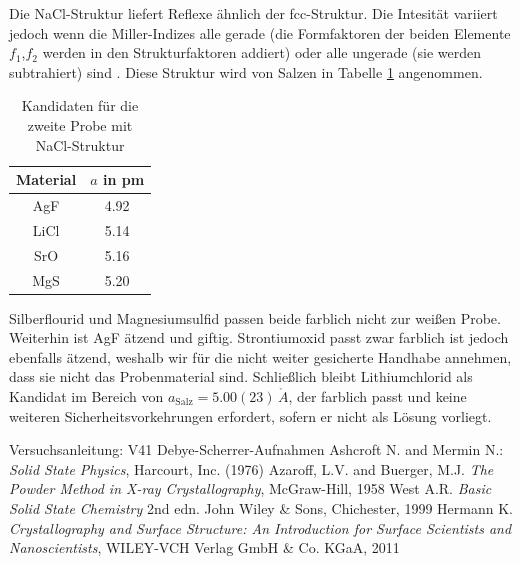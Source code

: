 \noindent
Die NaCl-Struktur liefert Reflexe ähnlich der fcc-Struktur. Die Intesität variiert jedoch wenn die Miller-Indizes alle gerade
(die Formfaktoren der beiden Elemente $f_1$,$f_2$ werden in den Strukturfaktoren addiert) oder alle ungerade (sie werden subtrahiert) sind \cite{Azaroff}. Diese
Struktur wird von Salzen in Tabelle \ref{tab:matProb2} angenommen.
\begin{table}[H]
 \begin{tabular}{cc}
Material &$a$ in pm\\
\hline
AgF & 4.92\\ %
LiCl & 5.14\\ %
SrO& 5.16\\ %
MgS & 5.20  %
 \end{tabular}
 \caption{Kandidaten für die zweite Probe mit NaCl-Struktur \cite{Gitterparameter}\cite{Salz}}
 \label{tab:matProb2}

\end{table}
\noindent Silberflourid und Magnesiumsulfid passen beide farblich nicht zur weißen Probe. Weiterhin ist AgF ätzend und giftig. Strontiumoxid passt
zwar farblich ist jedoch ebenfalls ätzend, weshalb wir für die nicht weiter gesicherte Handhabe annehmen, dass sie nicht das Probenmaterial sind. 
Schließlich bleibt Lithiumchlorid als Kandidat im Bereich von $a_\text{Salz} = 5.00(23)\, \mathring{A} $, der farblich passt und keine weiteren Sicherheitsvorkehrungen erfordert, sofern er nicht als Lösung
vorliegt. 
\newpage
\begin{thebibliography}{xxx}
 Versuchsanleitung: V41 Debye-Scherrer-Aufnahmen
 Ashcroft N. and Mermin N.: \textit{Solid State Physics}, Harcourt, Inc. (1976) 
  Azaroff,  L.V.  and  Buerger,  M.J.  \textit{The  Powder  Method  in  X-ray  Crystallography},  McGraw-Hill,  1958
  West A.R. \textit{Basic Solid State Chemistry}  2nd edn. John Wiley \& Sons, Chichester, 1999
  Hermann K. \textit{Crystallography and Surface Structure: An Introduction for Surface Scientists and Nanoscientists}, WILEY-VCH Verlag GmbH \& Co. KGaA, 2011
\end{thebibliography}







